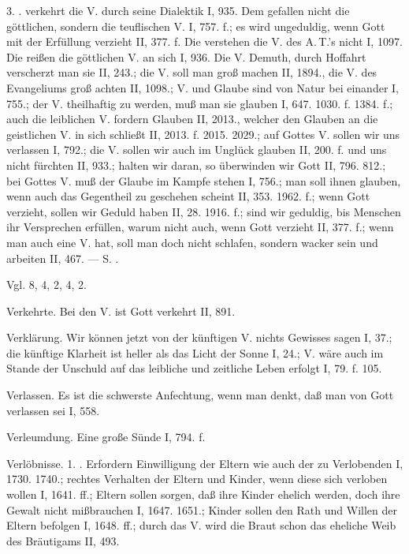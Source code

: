 3. .  verkehrt die V. durch seine Dialektik I, 935. Dem  gefallen nicht die göttlichen, sondern die teuflischen V. I, 757. f.; es wird ungeduldig, wenn Gott mit der Erfüllung verzieht II, 377. f. Die  verstehen die V. des A.\,T.’s nicht I, 1097. Die  reißen die göttlichen V. an sich I, 936. Die V.  Demuth, durch Hoffahrt verscherzt man sie II, 243.; die V. soll man groß machen II, 1894., die V. des Evangeliums groß achten II, 1098.; V. und Glaube sind von Natur bei einander I, 755.; der V. theilhaftig zu werden, muß man sie glauben I, 647. 1030. f. 1384. f.; auch die leiblichen V. fordern Glauben II, 2013., welcher den Glauben an die geistlichen V. in sich schließt II, 2013. f. 2015. 2029.; auf Gottes V. sollen wir uns verlassen I, 792.; die V. sollen wir auch im Unglück glauben II, 200. f. und uns nicht fürchten II, 933.; halten wir daran, so überwinden wir Gott II, 796. 812.; bei Gottes V. muß der Glaube im Kampfe stehen I, 756.; man soll ihnen glauben, wenn auch das Gegentheil zu geschehen scheint II, 353. 1962. f.; wenn Gott verzieht, sollen wir Geduld haben II, 28. 1916. f.; sind wir geduldig, bis Menschen ihr Versprechen erfüllen, warum nicht auch, wenn Gott verzieht II, 377. f.; wenn man auch eine V. hat, soll man doch nicht schlafen, sondern wacker sein und arbeiten II, 467. — S. .

Vgl.  8,  4,  2,  4,  2.

Verkehrte. Bei den V. ist Gott verkehrt II, 891.

Verklärung. Wir können jetzt von der künftigen V. nichts Gewisses sagen I, 37.; die künftige Klarheit ist heller als das Licht der Sonne I, 24.; V. wäre auch im Stande der Unschuld auf das leibliche und zeitliche Leben erfolgt I, 79. f. 105.

Verlassen. Es ist die schwerste Anfechtung, wenn man denkt, daß man von Gott verlassen sei I, 558.

Verleumdung. Eine große Sünde I, 794. f.

Verlöbnisse. 1. . Erfordern Einwilligung der Eltern wie auch der zu Verlobenden I, 1730. 1740.; rechtes Verhalten der Eltern und Kinder, wenn diese sich verloben wollen I, 1641. ff.; Eltern sollen sorgen, daß ihre Kinder ehelich werden, doch ihre Gewalt nicht mißbrauchen I, 1647. 1651.; Kinder sollen den Rath und Willen der Eltern befolgen I, 1648. ff.; durch das V. wird die Braut schon das eheliche Weib des Bräutigams II, 493.

